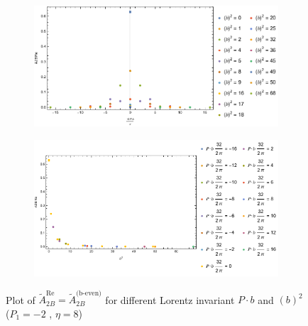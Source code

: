\documentclass[]{article}
\numberwithin{equation}{section}
\newcommand{\tAmp}{\widetilde{A}}
\newcommand{\tAmp}{\ensuremath{\widetilde{A}^{(+)}}}
\begin{document}
\begin{figure}[h!]
     \centering
     \begin{subfigure}[b]{0.45\textwidth}
         \centering
         \includegraphics[width=\textwidth]{Amp_plots/bP_A2B_b_even_P1_-2_eta_8.pdf}
     \end{subfigure}
     \begin{subfigure}[b]{0.45\textwidth}
         \centering
         \includegraphics[width=\textwidth]{Amp_plots/bsq_A2B_b_even_P1_-2_eta_8.pdf}
     \end{subfigure}
        \caption{Plot of $\tAmp^{\text{Re}}_{2B}=\tAmp^{\text{(b-even)}}_{2B}$ for different Lorentz invariant $P\cdot b$ and $(b)^2$  ($P_{1} = -2$ , $\eta=8$)}
\end{figure}
\end{document}
